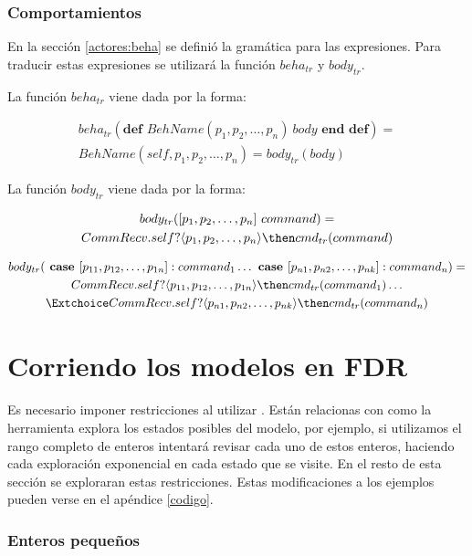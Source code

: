 \subsubsection*{Comportamientos}
En la sección \ref{actores:beha} se definió la gramática para las expresiones. Para traducir estas expresiones se utilizará la función $beha_{tr}$ y $body_{tr}$.

La función $beha_{tr}$ viene dada por la forma:

\begin{multline*}
beha_{tr}(\textbf{def } BehName(p_1, p_2,\ldots, p_n)\ body \textbf{ end def}) = \\
BehName(self, p_1, p_2,\ldots, p_n) = body_{tr}(body) 
\end{multline*}

La función $body_{tr}$ viene dada por la forma:

\begin{multline*}
body_{tr}([ p_1, p_2,\ldots, p_n]\ command) = \\
 CommRecv.self?\langle p_1, p_2,\ldots, p_n \rangle \then cmd_{tr}(command)
\end{multline*}

\begin{multline*}
body_{tr}(\textbf{ case } [p_{11}, p_{12},\ldots, p_{1n}]: command_1 \ldots \textbf{ case } [p_{n1}, p_{n2},\ldots, p_{nk}]: command_n ) = \\
CommRecv.self?\langle p_{11}, p_{12},\ldots, p_{1n} \rangle \then cmd_{tr}(command_1) \ldots \\
\Extchoice CommRecv.self?\langle p_{n1}, p_{n2},\ldots, p_{nk} \rangle \then cmd_{tr}(command_n) 
\end{multline*}

\section{Corriendo los modelos en FDR}

Es necesario imponer restricciones al utilizar \FDR. Están relacionas con como la herramienta explora los estados posibles del modelo, por ejemplo, si utilizamos el rango completo de enteros intentará revisar cada uno de estos enteros, haciendo cada exploración exponencial en cada estado que se visite. En el resto de esta sección se exploraran estas restricciones. Estas modificaciones a los ejemplos pueden verse en el apéndice \ref{codigo}.

\subsubsection*{Enteros pequeños}

